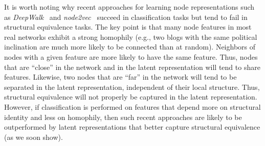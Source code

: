 \documentclass[sigconf]{acmart}
\begin{document}
It is worth noting why recent approaches for learning node representations such as \textit{DeepWalk}~\cite{Perozzi2014} and \textit{node2vec}~\cite{node2vec-kdd2016} succeed in classification tasks but tend to fail in structural equivalence tasks. The key point is that many node features in most real networks exhibit a strong homophily (e.g., two blogs with the same political inclination are much more likely to be connected than at random). Neighbors of nodes with a given feature are more likely to have the same feature. Thus, nodes that are ``close'' in the network and in the latent representation will tend to share features. Likewise, two nodes that are ``far'' in the network will tend to be separated in the latent representation, independent of their local structure. Thus, structural equivalence will not properly be captured in the latent representation. However, if classification is performed on features that depend more on structural identity and less on homophily, then such recent approaches are likely to be outperformed by latent representations that better capture structural equivalence (as we soon show). 
\end{document}
